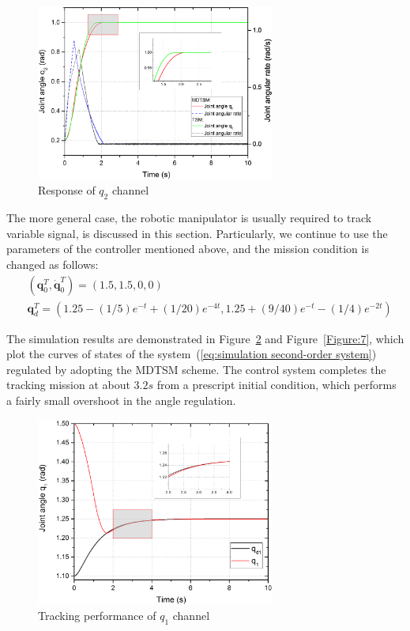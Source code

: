 \documentclass[3p]{elsarticle}
\theoremstyle{plain}
\theoremstyle{remark}
\begin{document}
\begin{figure}
\centering
\includegraphics[width=0.7\textwidth]{paper3_fig5.eps}
\caption{Response of $q_2$ channel}
\label{Figure:5}
\end{figure}
The more general case, the robotic manipulator is usually required to track variable signal, is discussed in this section. Particularly, we continue to use the parameters of the controller mentioned above, and the mission condition is changed as follows:
\begin{align*}
&(\bm q_0^T, \dot{\bm q}_0^T)= (1.5,1.5,0,0)\\
&{\bm q}_d^T=(1.25-(1/5)e^{-t}+(1/20)e^{-4t},1.25+(9/40)e^{-t}-(1/4)e^{-2t})
\end{align*}\par
The simulation results are demonstrated in Figure~\ref{Figure:6} and Figure~\ref{Figure:7}, which plot the curves of states of the system~(\ref{eq:simulation second-order system}) regulated by adopting the MDTSM scheme. The control system completes the tracking mission at about $3.2s$ from a prescript initial condition, which performs a fairly small overshoot in the angle regulation.
\begin{figure}
\centering
\includegraphics[width=0.7\textwidth]{paper3_fig6.eps}
\caption{Tracking performance of $q_1$ channel}
\label{Figure:6}
\end{figure}
\end{document}
